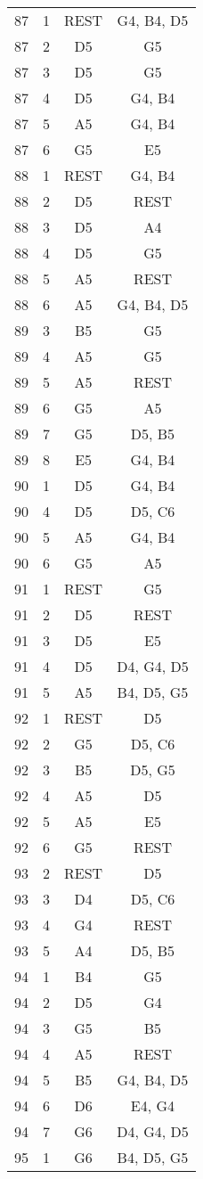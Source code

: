 \documentclass{article}
\begin{document}
\begin{longtable}{|c|c|c|c|}
87 & 1 & REST & G4, B4, D5 \\ 
87 & 2 & D5 & G5 \\ 
87 & 3 & D5 & G5 \\ 
87 & 4 & D5 & G4, B4 \\ 
87 & 5 & A5 & G4, B4 \\ 
87 & 6 & G5 & E5 \\ 
\hline
88 & 1 & REST & G4, B4 \\ 
88 & 2 & D5 & REST \\ 
88 & 3 & D5 & A4 \\ 
88 & 4 & D5 & G5 \\ 
88 & 5 & A5 & REST \\ 
88 & 6 & A5 & G4, B4, D5 \\ 
\hline
89 & 3 & B5 & G5 \\ 
89 & 4 & A5 & G5 \\ 
89 & 5 & A5 & REST \\ 
89 & 6 & G5 & A5 \\ 
89 & 7 & G5 & D5, B5 \\ 
89 & 8 & E5 & G4, B4 \\ 
\hline
90 & 1 & D5 & G4, B4 \\ 
90 & 4 & D5 & D5, C6 \\ 
90 & 5 & A5 & G4, B4 \\ 
90 & 6 & G5 & A5 \\ 
\hline
91 & 1 & REST & G5 \\ 
91 & 2 & D5 & REST \\ 
91 & 3 & D5 & E5 \\ 
91 & 4 & D5 & D4, G4, D5 \\ 
91 & 5 & A5 & B4, D5, G5 \\ 
\hline
92 & 1 & REST & D5 \\ 
92 & 2 & G5 & D5, C6 \\ 
92 & 3 & B5 & D5, G5 \\ 
92 & 4 & A5 & D5 \\ 
92 & 5 & A5 & E5 \\ 
92 & 6 & G5 & REST \\ 
\hline
93 & 2 & REST & D5 \\ 
93 & 3 & D4 & D5, C6 \\ 
93 & 4 & G4 & REST \\ 
93 & 5 & A4 & D5, B5 \\ 
\hline
94 & 1 & B4 & G5 \\ 
94 & 2 & D5 & G4 \\ 
94 & 3 & G5 & B5 \\ 
94 & 4 & A5 & REST \\ 
94 & 5 & B5 & G4, B4, D5 \\ 
94 & 6 & D6 & E4, G4 \\ 
94 & 7 & G6 & D4, G4, D5 \\ 
\hline
95 & 1 & G6 & B4, D5, G5 \\ 
\hline
\end{longtable}
\end{document}
